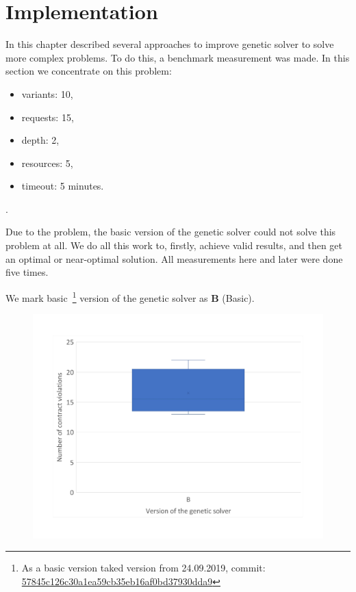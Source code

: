 \chapter{Implementation}\label{chapter:Implementation}

In this chapter described several approaches to improve genetic solver to solve more complex problems.
To do this, a benchmark measurement was made.
In this section we concentrate on this problem:

\begin{itemize}
	\item variants: 10,
	\item requests: 15,
	\item depth: 2,
	\item resources: 5,
	\item timeout: 5 minutes.
\end{itemize}.

Due to the problem, the basic version of the genetic solver could not solve this problem at all. We do all this work to, firstly, achieve valid results, and then get an optimal or near-optimal solution. 
All measurements here and later were done five times.


We mark basic~\footnote{As a basic version taked version from 24.09.2019, commit: \href{https://git-st.inf.tu-dresden.de/mquat/mquat2/commit/57845c126c30a1ea59cb35eb16af0bd37930dda9}{57845c126c30a1ea59cb35eb16af0bd37930dda9}} version of the genetic solver as \textbf{B} (Basic).


\begin{figure}[h]
	\centering
	\includegraphics[width=\textwidth]{images/BoxPlotSolverBasic}
	\caption[Boxplot with a number of contract violations for the basic version of genetic solver]{}
	\label{fig:boxplotsolverbasic}
\end{figure}


